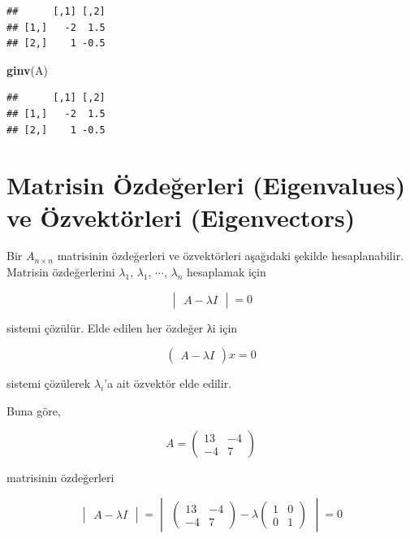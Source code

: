 \documentclass[
]{book}
\newenvironment{Shaded}{\begin{snugshade}}{\end{snugshade}}
\newcommand{\FunctionTok}[1]{\textcolor[rgb]{0.13,0.29,0.53}{\textbf{#1}}}
\newcommand{\NormalTok}[1]{#1}
\begin{document}
\begin{verbatim}
##      [,1] [,2]
## [1,]   -2  1.5
## [2,]    1 -0.5
\end{verbatim}

\begin{Shaded}
\begin{Highlighting}[]
 \FunctionTok{ginv}\NormalTok{(A) }
\end{Highlighting}
\end{Shaded}

\begin{verbatim}
##      [,1] [,2]
## [1,]   -2  1.5
## [2,]    1 -0.5
\end{verbatim}

\section{Matrisin Özdeğerleri (Eigenvalues) ve Özvektörleri (Eigenvectors)}\label{matrisin-uxf6zdeux11ferleri-eigenvalues-ve-uxf6zvektuxf6rleri-eigenvectors}

Bir \(A_{n×n}\) matrisinin özdeğerleri ve özvektörleri aşağıdaki şekilde hesaplanabilir. Matrisin özdeğerlerini \(\lambda_1\), \(\lambda_1\), \(\cdots\), \(\lambda_n\) hesaplamak için

\[\begin{vmatrix}
 A-\lambda I 
\end{vmatrix}
= 0\]

sistemi çözülür. Elde edilen her özdeğer λi için

\[\begin{pmatrix}
 A-\lambda I 
\end{pmatrix}
x = 0\]

sistemi çözülerek \(\lambda_i\)'a ait özvektör elde edilir.

Buna göre,

\[A=
\begin{pmatrix}
 13 & -4 \\
 -4 & 7 
\end{pmatrix}\]

matrisinin özdeğerleri

\[\begin{vmatrix}
 A-\lambda I 
\end{vmatrix}
= 
\begin{vmatrix}
 \begin{pmatrix}
  13 & -4 \\
  -4 & 7 
 \end{pmatrix}
-\lambda 
\begin{pmatrix}
 1 & 0 \\
 0 & 1 
\end{pmatrix}
\end{vmatrix}
= 0\]
\end{document}
